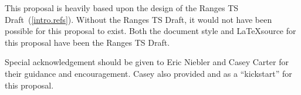 \setcounter{chapter}{0}

This proposal is heavily based upon the design of the Ranges TS
Draft~(\ref{intro.refs}). Without the Ranges TS Draft, it would
not have been possible for this proposal to exist. Both the
document style and \LaTeX source for this proposal have been
 the Ranges TS
Draft.

Special acknowledgement should be given to Eric Niebler and Casey
Carter for their guidance and encouragement. Casey also provided
 and  as a
``kickstart'' for this proposal.